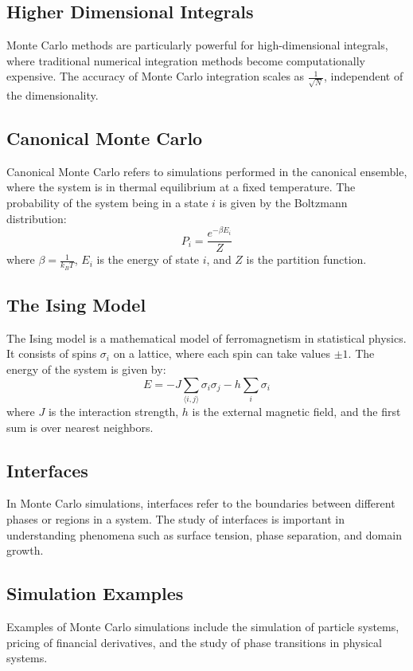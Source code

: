 \documentclass[12pt]{article}
\begin{document}
\subsection{Higher Dimensional Integrals}
Monte Carlo methods are particularly powerful for high-dimensional integrals, where traditional numerical integration methods become computationally expensive. The accuracy of Monte Carlo integration scales as \( \frac{1}{\sqrt{N}} \), independent of the dimensionality.

\subsection{Canonical Monte Carlo}
Canonical Monte Carlo refers to simulations performed in the canonical ensemble, where the system is in thermal equilibrium at a fixed temperature. The probability of the system being in a state \( i \) is given by the Boltzmann distribution:
\[
P_i = \frac{e^{-\beta E_i}}{Z}
\]
where \( \beta = \frac{1}{k_B T} \), \( E_i \) is the energy of state \( i \), and \( Z \) is the partition function.

\subsection{The Ising Model}
The Ising model is a mathematical model of ferromagnetism in statistical physics. It consists of spins \( \sigma_i \) on a lattice, where each spin can take values \( \pm 1 \). The energy of the system is given by:
\[
E = -J \sum_{\langle i,j \rangle} \sigma_i \sigma_j - h \sum_i \sigma_i
\]
where \( J \) is the interaction strength, \( h \) is the external magnetic field, and the first sum is over nearest neighbors.

\subsection{Interfaces}
In Monte Carlo simulations, interfaces refer to the boundaries between different phases or regions in a system. The study of interfaces is important in understanding phenomena such as surface tension, phase separation, and domain growth.

\subsection{Simulation Examples}
Examples of Monte Carlo simulations include the simulation of particle systems, pricing of financial derivatives, and the study of phase transitions in physical systems.
\end{document}
